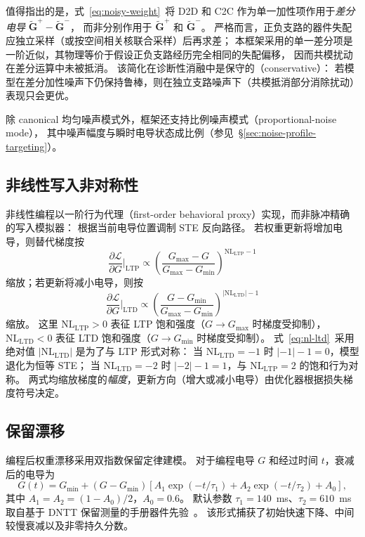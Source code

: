 值得指出的是，式~\ref{eq:noisy-weight}~将 D2D 和 C2C 作为单一加性项作用于\emph{差分电导} $\widetilde{\mathbf{G}}^{+} - \widetilde{\mathbf{G}}^{-}$，
而非分别作用于 $\widetilde{\mathbf{G}}^{+}$ 和 $\widetilde{\mathbf{G}}^{-}$。
严格而言，正负支路的器件失配应独立采样（或按空间相关核联合采样）后再求差；
本框架采用的单一差分项是一阶近似，其物理等价于假设正负支路经历完全相同的失配偏移，
因而共模扰动在差分运算中未被抵消。
该简化在诊断性消融中是保守的（conservative）：
若模型在差分加性噪声下仍保持鲁棒，则在独立支路噪声下（共模抵消部分消除扰动）表现只会更优。

除 canonical 均匀噪声模式外，框架还支持比例噪声模式（proportional-noise mode），
其中噪声幅度与瞬时电导状态成比例（参见~\S\ref{sec:noise-profile-targeting}）。

\subsection{非线性写入非对称性}

非线性编程以一阶行为代理（first-order behavioral proxy）实现，而非脉冲精确的写入模拟器：
根据当前电导位置调制 STE 反向路径。
若权重更新将增加电导，则替代梯度按
\begin{equation}
\frac{\partial \mathcal{L}}{\partial G}\Big|_{\mathrm{LTP}} \propto \left(\frac{G_{\max}-G}{G_{\max}-G_{\min}}\right)^{\mathrm{NL}_{\mathrm{LTP}}-1}
\label{eq:nl-ltp}
\end{equation}
缩放；若更新将减小电导，则按
\begin{equation}
\frac{\partial \mathcal{L}}{\partial G}\Big|_{\mathrm{LTD}} \propto \left(\frac{G-G_{\min}}{G_{\max}-G_{\min}}\right)^{|\mathrm{NL}_{\mathrm{LTD}}|-1}
\label{eq:nl-ltd}
\end{equation}
缩放。
这里 $\mathrm{NL}_{\mathrm{LTP}} > 0$ 表征 LTP 饱和强度（$G \to G_{\max}$ 时梯度受抑制），
$\mathrm{NL}_{\mathrm{LTD}} < 0$ 表征 LTD 饱和强度（$G \to G_{\min}$ 时梯度受抑制）。
式~\ref{eq:nl-ltd}~采用绝对值 $|\mathrm{NL}_{\mathrm{LTD}}|$ 是为了与 LTP 形式对称：
当 $\mathrm{NL}_{\mathrm{LTD}} = -1$ 时 $|-1|-1 = 0$，模型退化为恒等 STE；
当 $\mathrm{NL}_{\mathrm{LTD}} = -2$ 时 $|-2|-1 = 1$，与 $\mathrm{NL}_{\mathrm{LTP}} = 2$ 的饱和行为对称。
两式均缩放梯度的\emph{幅度}，更新方向（增大或减小电导）由优化器根据损失梯度符号决定。

\subsection{保留漂移}

编程后权重漂移采用双指数保留定律建模。
对于编程电导 $G$ 和经过时间 $t$，衰减后的电导为
\begin{equation}
G(t) = G_{\min} + \left(G - G_{\min}\right) \left[A_1 \exp\left(-t/\tau_1\right) + A_2 \exp\left(-t/\tau_2\right) + A_0\right],
\label{eq:retention}
\end{equation}
其中 $A_1 = A_2 = (1-A_0)/2$，$A_0 = 0.6$。
默认参数 $\tau_1 = 140$~ms、$\tau_2 = 610$~ms 取自基于 DNTT 保留测量的手册器件先验~\parencite{vincze2025dualplasticity}。
该形式捕获了初始快速下降、中间较慢衰减以及非零持久分数。

